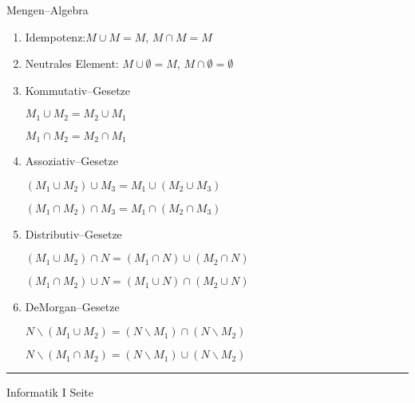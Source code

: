 \begin{slide}{}
\normalsize
\begin{center}
    Mengen--Algebra
\end{center}
\footnotesize
\begin{enumerate}
\item Idempotenz:\quad      $M \cup M = M$,     $M \cap M = M$
\item Neutrales Element:    $M \cup \emptyset = M$, $M \cap \emptyset = \emptyset$

\item Kommutativ--Gesetze

        $M_1 \cup M_2 = M_2 \cup M_1$

        $M_1 \cap M_2 = M_2 \cap M_1$
\item Assoziativ--Gesetze

      $(M_1 \cup M_2) \cup M_3 = M_1 \cup (M_2 \cup M_3)$

      $(M_1 \cap M_2) \cap M_3 = M_1 \cap (M_2 \cap M_3)$

\item Distributiv--Gesetze

      $(M_1 \cup M_2) \cap N = (M_1 \cap N) \cup (M_2 \cap N)$

      $(M_1 \cap M_2) \cup N = (M_1 \cup N) \cap (M_2 \cup N)$
\item DeMorgan--Gesetze

      $N \backslash (M_1 \cup M_2) = (N \backslash M_1) \cap (N \backslash M_2)$

      $N \backslash (M_1 \cap M_2) = (N \backslash M_1) \cup (N \backslash M_2)$
\end{enumerate}
\vspace*{\fill}
\tiny \addtocounter{mypage}{1}
\rule{15cm}{1mm}
Informatik I  \hspace*{\fill} Seite 
\end{slide}


